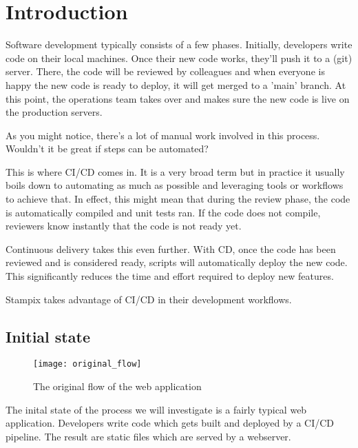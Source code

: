 
\chapter{Introduction} %

\label{Chapter1} 


Software development typically consists of a few phases. Initially, developers write code on their local machines. 
Once their new code works, they'll push it to a (git) server. 
There, the code will be reviewed by colleagues and when everyone is happy the new code is ready to deploy, it will get merged to a 'main' branch.
At this point, the operations team takes over and makes sure the new code is live on the production servers.

As you might notice, there's a lot of manual work involved in this process. Wouldn't it be great if steps can be automated?

This is where CI/CD comes in. It is a very broad term but in practice it usually boils down to automating as much as possible and leveraging tools or workflows to achieve that.
In effect, this might mean that during the review phase, the code is automatically compiled and unit tests ran. If the code does not compile, reviewers know instantly that the code is not ready yet.

Continuous delivery \cite{Humble-CD} takes this even further. With CD, once the code has been reviewed and is considered ready, scripts will automatically deploy the new code.
This significantly reduces the time and effort required to deploy new features.

Stampix takes advantage of CI/CD in their development workflows.

\section{Initial state}

\begin{figure}[h!]
	\texttt{[image: original\_flow]}
	\caption{The original flow of the web application}
	\label{fig:original_flow}
\end{figure}


The inital state of the process we will investigate is a fairly typical web application. Developers write code which gets built and deployed by a CI/CD pipeline. The result are static files which are served by a webserver.

